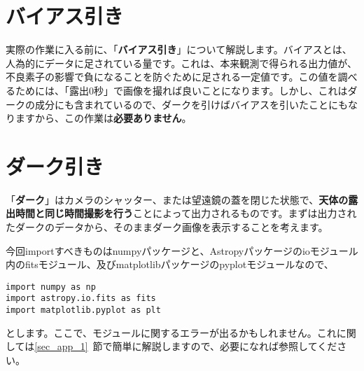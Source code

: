 \section{バイアス引き}
\label{sec_3_2}
実際の作業に入る前に、「\textbf{バイアス引き}」について解説します。バイアスとは、人為的にデータに足されている量です。これは、本来観測で得られる出力値が、不良素子の影響で負になることを防ぐために足される一定値です。この値を調べるためには、「露出$0$秒」で画像を撮れば良いことになります。しかし、これはダークの成分にも含まれているので、ダークを引けばバイアスを引いたことにもなりますから、この作業は\textbf{必要ありません}。

\section{ダーク引き}
\label{sec_3_3}
「\textbf{ダーク}」はカメラのシャッター、または望遠鏡の蓋を閉じた状態で、\textbf{天体の露出時間と同じ時間撮影を行う}ことによって出力されるものです。まずは出力されたダークのデータから、そのままダーク画像を表示することを考えます。

今回importすべきものはnumpyパッケージと、Astropyパッケージのioモジュール内のfitsモジュール、及びmatplotlibパッケージのpyplotモジュールなので、
\begin{lstlisting}[caption=importについて,label=code_3_3_1]
import numpy as np
import astropy.io.fits as fits
import matplotlib.pyplot as plt
\end{lstlisting}
とします。ここで、モジュールに関するエラーが出るかもしれません。これに関しては\ref{sec_app_1}~節で簡単に解説しますので、必要になれば参照してください。

